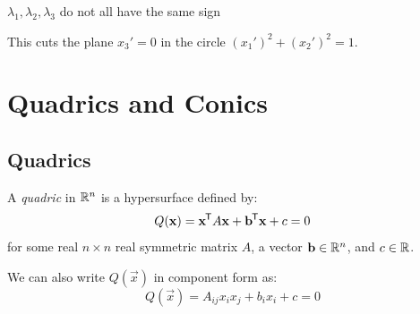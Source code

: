 \documentclass[../main.tex]{subfiles}
\begin{document}
\begin{example}
\begin{proofcases}
\begin{case}{$\lambda_1, \lambda_2, \lambda_3$ do not all have the same sign}
\begin{center}
      \end{center}
      This cuts the plane $x_3' = 0$ in the circle $(x_1')^2 + (x_2')^2 = 1$.
    \end{case}
  \end{proofcases}
\end{example}
\section{Quadrics and Conics}
\subsection{Quadrics}
A \textit{quadric} in $\mathbb{R}^{n}$ is a hypersurface defined by:
\[
  Q(\mathbf{\bm{x}}) = \mathbf{\bm{x}}^{{\mkern-1.5mu\mathsf{T}}}A\mathbf{\bm{x}} + \mathbf{\bm{b}}^{{\mkern-1.5mu\mathsf{T}}}\mathbf{\bm{x}} + c = 0
\]
for some real $n \times n$ real symmetric matrix $A$, a vector $\mathbf{\bm{b}} \in \mathbb{R}^{n}$, and $c \in \mathbb{R}$.

We can also write $Q(\vec{x})$ in component form as:
\[
  Q(\vec{x}) = A_{i j}x_ix_j + b_i x_i + c = 0
\]
\end{document}

